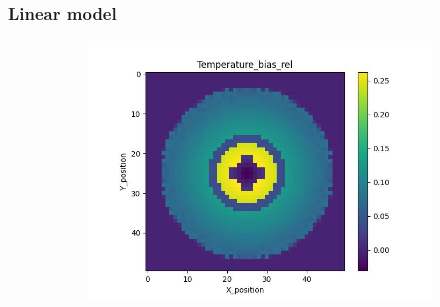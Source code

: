 \subsubsection{Linear model}

\begin{figure}[htbp]
    \centering
    \begin{minipage}{\textwidth}
        \centering
        \begin{subfigure}{0.49\textwidth}
            \centering
            \includegraphics[width=\textwidth]{figures/raw_data/31/linear/T_bias.jpg}
        \end{subfigure}
        \begin{subfigure}{0.49\textwidth}
            \centering

\end{subfigure}
\end{minipage}
\end{figure}
